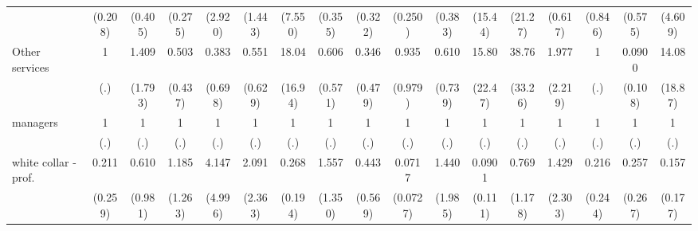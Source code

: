 {\begin{tabular}{l*{16}{c}}
                    &     (0.208)         &     (0.405)         &     (0.275)         &     (2.920)         &     (1.443)         &     (7.550)         &     (0.355)         &     (0.322)         &     (0.250)         &     (0.383)         &     (15.44)         &     (21.27)         &     (0.617)         &     (0.846)         &     (0.575)         &     (4.609)         \\
[1em]
Other services      &           1         &       1.409         &       0.503         &       0.383         &       0.551         &       18.04\sym{**} &       0.606         &       0.346         &       0.935         &       0.610         &       15.80         &       38.76\sym{***}&       1.977         &           1         &      0.0900\sym{*}  &       14.08\sym{*}  \\
                    &         (.)         &     (1.793)         &     (0.437)         &     (0.698)         &     (0.629)         &     (16.94)         &     (0.571)         &     (0.479)         &     (0.979)         &     (0.739)         &     (22.47)         &     (33.26)         &     (2.219)         &         (.)         &     (0.108)         &     (18.87)         \\
[1em]
managers            &           1         &           1         &           1         &           1         &           1         &           1         &           1         &           1         &           1         &           1         &           1         &           1         &           1         &           1         &           1         &           1         \\
                    &         (.)         &         (.)         &         (.)         &         (.)         &         (.)         &         (.)         &         (.)         &         (.)         &         (.)         &         (.)         &         (.)         &         (.)         &         (.)         &         (.)         &         (.)         &         (.)         \\
[1em]
white collar - prof.&       0.211         &       0.610         &       1.185         &       4.147         &       2.091         &       0.268         &       1.557         &       0.443         &      0.0717\sym{**} &       1.440         &      0.0901         &       0.769         &       1.429         &       0.216         &       0.257         &       0.157         \\
                    &     (0.259)         &     (0.981)         &     (1.263)         &     (4.996)         &     (2.363)         &     (0.194)         &     (1.350)         &     (0.569)         &    (0.0727)         &     (1.985)         &     (0.111)         &     (1.178)         &     (2.303)         &     (0.244)         &     (0.267)         &     (0.177)         \\

\end{tabular}}
